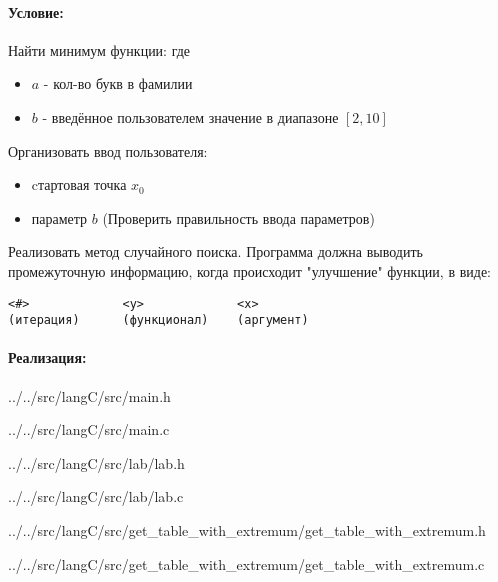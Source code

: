 \paragraph{Условие:} \hspace{0pt}

Найти минимум функции: где

\begin{itemize}
    \item $a$ - кол-во букв в фамилии
    \item $b$ - введённое пользователем значение в диапазоне $[2, 10]$
\end{itemize}

Организовать ввод пользователя:

\begin{itemize}
    \item cтартовая точка $x_0$
    \item параметр $b$ (Проверить правильность ввода параметров)
\end{itemize}
Реализовать метод случайного поиска. Программа должна выводить промежуточную информацию, когда происходит "улучшение" функции, в виде:

\begin{lstlisting}[language=empty,]
<#>             <y>             <x>
(итерация)      (функционал)    (аргумент)
\end{lstlisting}


\paragraph{Реализация:} \hspace{0pt}



{../../src/langC/src/main.h}


{../../src/langC/src/main.c}



{../../src/langC/src/lab/lab.h}


{../../src/langC/src/lab/lab.c}


\newpage



{../../src/langC/src/get_table_with_extremum/get_table_with_extremum.h}


{../../src/langC/src/get_table_with_extremum/get_table_with_extremum.c}


